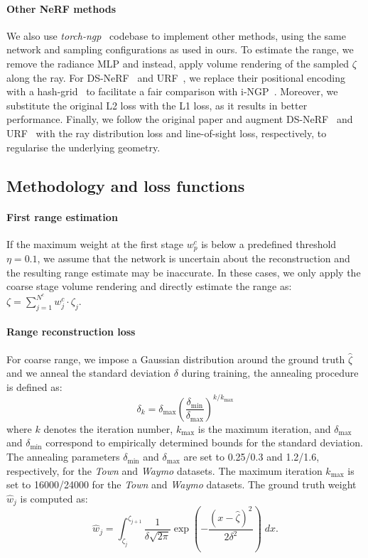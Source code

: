 \paragraph{Other NeRF methods}
We also use \emph{torch-ngp}~\cite{torch-ngp} codebase to implement other methods, using the same network and sampling configurations as used in ours. To estimate the range, we remove the radiance MLP and instead, apply volume rendering of the sampled $\zeta$ along the ray.  For DS-NeRF~\cite{deng2021depth} and URF~\cite{rematas2021urban}, we replace their positional encoding with a hash-grid~\cite{mueller2022instant} to facilitate a fair comparison with i-NGP~\cite{mueller2022instant}. Moreover, we substitute the original L2 loss with the L1 loss, as it results in better performance. Finally, we follow the original paper and augment DS-NeRF~\cite{deng2021depth} and URF~\cite{rematas2021urban} with the ray distribution loss and line-of-sight loss, respectively, to regularise the underlying geometry. 


\subsection{Methodology and loss functions}
\label{sec:supp_method}
\paragraph{First range estimation}
If the maximum weight at the first stage $w_p^c$ is below a predefined threshold $\eta=0.1$, we assume that the network is uncertain about the reconstruction and the resulting range estimate may be inaccurate. In these cases, we only apply the coarse stage volume rendering and directly estimate the range as: $\zeta = \sum_{j=1}^{N^c} w_j^c \cdot \zeta_j$. 

\paragraph{Range reconstruction loss}
For coarse range, we impose a Gaussian distribution around the ground truth $\hat{\zeta}$ and we anneal the standard deviation $\delta$ during training, the annealing procedure is defined as:
\begin{equation}
    \delta_k = \delta_{\max} \left(\frac{\delta_{\min}}{\delta_{\max}}\right)^{k / k_{\max}}
\end{equation}
where $k$ denotes the iteration number, $k_{\max}$ is the maximum iteration, and $\delta_{\max}$ and $\delta_{\min}$ correspond to empirically determined bounds for the standard deviation. The annealing parameters $\delta_{\min}$ and $\delta_{\max}$ are set to 0.25/0.3 and 1.2/1.6, respectively, for the \textit{Town} and \textit{Waymo} datasets. The maximum iteration $k_{\max}$ is set to 16000/24000 for the \textit{Town} and \textit{Waymo} datasets. 
The ground truth weight $\hat{w}_j$ is computed as:
\begin{equation}
    \hat{w}_j = \int_{\zeta_j}^{\zeta_{j+1}} \frac{1}{\delta\sqrt{2\pi}}\exp\left(-\frac{(x - \hat{\zeta})^2}{2\delta^2}\right) \; dx.
\end{equation}


